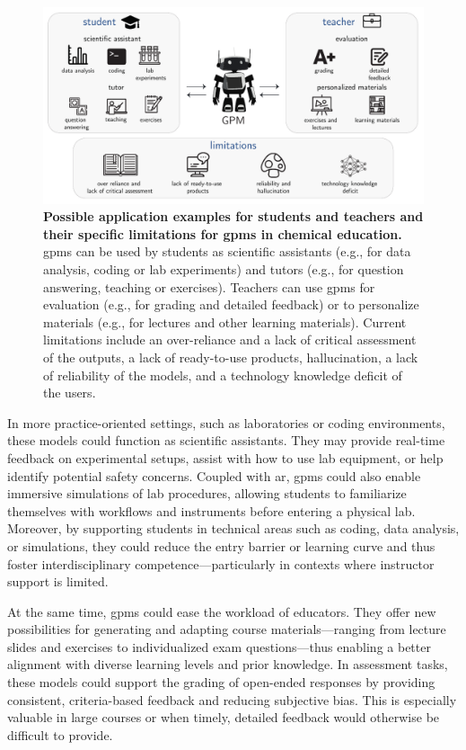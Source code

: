 \begin{figure}[htb]
    \centering
    \includegraphics[width=1\linewidth]{figures/rescaled_figures/chemrev_figure23.pdf}
    \caption{\textbf{Possible application examples for students and teachers and their specific limitations for \glspl{gpm} in chemical education.} \glspl{gpm} can be used by students as scientific assistants (e.g., for data analysis, coding or lab experiments) and tutors (e.g., for question answering, teaching or exercises). Teachers can use \glspl{gpm} for evaluation (e.g., for grading and detailed feedback) or to personalize materials (e.g., for lectures and other learning materials). Current limitations include an over-reliance and a lack of critical assessment of the outputs, a lack of ready-to-use products, hallucination, a lack of reliability of the models, and a technology knowledge deficit of the users.}
    \label{fig:education}
\end{figure}

In more practice-oriented settings, such as laboratories or coding environments, these models could function as scientific assistants. They may provide real-time feedback on experimental setups, assist with how to use lab equipment, or help identify potential safety concerns.\autocite{Du2024} 
Coupled with \gls{ar}, \glspl{gpm} could also enable immersive simulations of lab procedures, allowing students to familiarize themselves with workflows and instruments before entering a physical lab. 
Moreover, by supporting students in technical areas such as coding, data analysis, or simulations, they could reduce the entry barrier or learning curve and thus foster interdisciplinary competence---particularly in contexts where instructor support is limited.

At the same time, \glspl{gpm} could ease the workload of educators. 
They offer new possibilities for generating and adapting course materials---ranging from lecture slides and exercises to individualized exam questions---thus enabling a better alignment with diverse learning levels and prior knowledge. In assessment tasks, these models could support the grading of open-ended responses by providing consistent, criteria-based feedback and reducing subjective bias.\autocite{Kortemeyer2024, gao2024towards} This is especially valuable in large courses or when timely, detailed feedback would otherwise be difficult to provide. 


